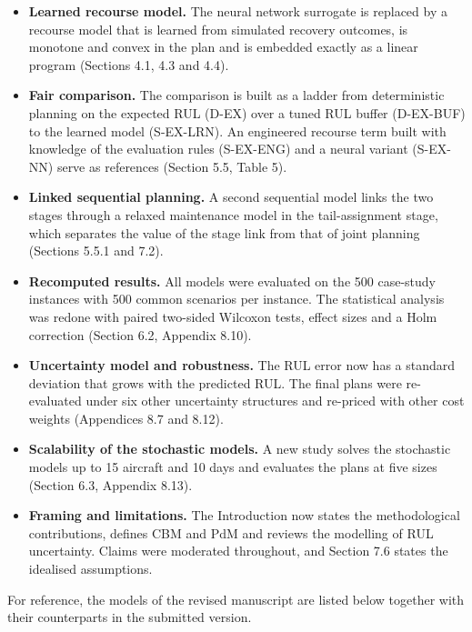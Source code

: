 \documentclass{article}
\begin{document}
\begin{itemize}
\item \textbf{Learned recourse model.} The neural network surrogate is replaced by a recourse model that is learned from simulated recovery outcomes, is monotone and convex in the plan and is embedded exactly as a linear program (Sections 4.1, 4.3 and 4.4).
\item \textbf{Fair comparison.} The comparison is built as a ladder from deterministic planning on the expected RUL (D-EX) over a tuned RUL buffer (D-EX-BUF) to the learned model (S-EX-LRN). An engineered recourse term built with knowledge of the evaluation rules (S-EX-ENG) and a neural variant (S-EX-NN) serve as references (Section 5.5, Table 5).
\item \textbf{Linked sequential planning.} A second sequential model links the two stages through a relaxed maintenance model in the tail-assignment stage, which separates the value of the stage link from that of joint planning (Sections 5.5.1 and 7.2).
\item \textbf{Recomputed results.} All models were evaluated on the 500 case-study instances with 500 common scenarios per instance. The statistical analysis was redone with paired two-sided Wilcoxon tests, effect sizes and a Holm correction (Section 6.2, Appendix 8.10).
\item \textbf{Uncertainty model and robustness.} The RUL error now has a standard deviation that grows with the predicted RUL. The final plans were re-evaluated under six other uncertainty structures and re-priced with other cost weights (Appendices 8.7 and 8.12).
\item \textbf{Scalability of the stochastic models.} A new study solves the stochastic models up to 15 aircraft and 10 days and evaluates the plans at five sizes (Section 6.3, Appendix 8.13).
\item \textbf{Framing and limitations.} The Introduction now states the methodological contributions, defines CBM and PdM and reviews the modelling of RUL uncertainty. Claims were moderated throughout, and Section 7.6 states the idealised assumptions.
\end{itemize}

For reference, the models of the revised manuscript are listed below together with their counterparts in the submitted version.
\end{document}

